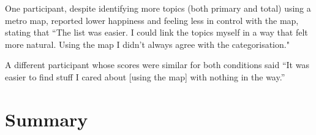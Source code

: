 One participant, despite identifying more topics (both primary and total) using a metro map, reported lower happiness and feeling less in control with the map, stating that ``The list was easier. I could link the topics myself in a way that felt more natural. Using the map I didn't always agree with the categorisation."

A different participant whose scores were similar for both conditions said ``It was easier to find stuff I cared about [using the map] with nothing in the way.''

\section{Summary}